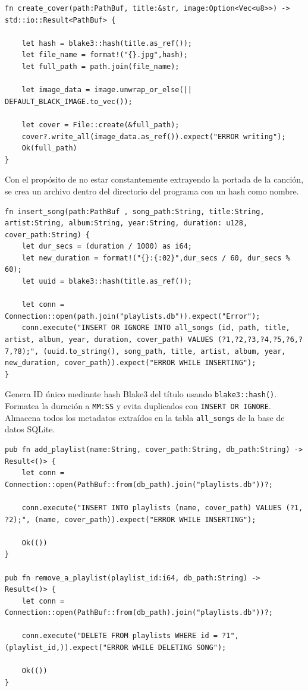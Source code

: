 \documentclass[11pt, a4paper]{article}
\begin{document}
            \begin{lstlisting}[caption={fn create\_cover()}]
fn create_cover(path:PathBuf, title:&str, image:Option<Vec<u8>>) -> std::io::Result<PathBuf> {

    let hash = blake3::hash(title.as_ref());
    let file_name = format!("{}.jpg",hash);
    let full_path = path.join(file_name);

    let image_data = image.unwrap_or_else(|| DEFAULT_BLACK_IMAGE.to_vec());

    let cover = File::create(&full_path);
    cover?.write_all(image_data.as_ref()).expect("ERROR writing");
    Ok(full_path)
}
            \end{lstlisting}

            Con el propósito de no estar constantemente extrayendo la portada de la canción, se crea un archivo dentro del directorio del programa con un hash como nombre.

            \begin{lstlisting}[caption={fn insert\_song()}]
fn insert_song(path:PathBuf , song_path:String, title:String, artist:String, album:String, year:String, duration: u128, cover_path:String) {
    let dur_secs = (duration / 1000) as i64;
    let new_duration = format!("{}:{:02}",dur_secs / 60, dur_secs % 60);
    let uuid = blake3::hash(title.as_ref());

    let conn = Connection::open(path.join("playlists.db")).expect("Error");
    conn.execute("INSERT OR IGNORE INTO all_songs (id, path, title, artist, album, year, duration, cover_path) VALUES (?1,?2,?3,?4,?5,?6,?7,?8);", (uuid.to_string(), song_path, title, artist, album, year, new_duration, cover_path)).expect("ERROR WHILE INSERTING");
}
            \end{lstlisting}

            Genera ID único mediante hash Blake3 del título usando \verb|blake3::hash()|. Formatea la duración a \verb|MM:SS| y evita duplicados con \verb|INSERT OR IGNORE|. Almacena todos los metadatos extraídos en la tabla \verb|all_songs| de la base de datos SQLite.

            \begin{lstlisting}[caption={Operaciones CRUD playlist}]
pub fn add_playlist(name:String, cover_path:String, db_path:String) -> Result<()> {
    let conn = Connection::open(PathBuf::from(db_path).join("playlists.db"))?;

    conn.execute("INSERT INTO playlists (name, cover_path) VALUES (?1, ?2);", (name, cover_path)).expect("ERROR WHILE INSERTING");

    Ok(())
}

pub fn remove_a_playlist(playlist_id:i64, db_path:String) -> Result<()> {
    let conn = Connection::open(PathBuf::from(db_path).join("playlists.db"))?;

    conn.execute("DELETE FROM playlists WHERE id = ?1",(playlist_id,)).expect("ERROR WHILE DELETING SONG");

    Ok(())
}
            \end{lstlisting}
\end{document}
